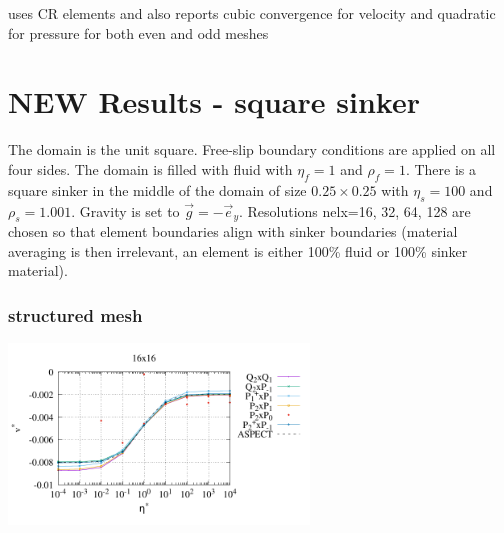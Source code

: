 \textcite{demh19} uses CR elements and also reports cubic convergence for velocity and quadratic for pressure
for both even and odd meshes


\newpage
\section*{NEW Results - square sinker}

The domain is the unit square. Free-slip boundary conditions are applied on all 
four sides. The domain is filled with fluid with $\eta_f=1$ and $\rho_f=1$.
There is a square sinker in the middle of the domain of size $0.25\times 0.25$ with $\eta_s=100$ and
$\rho_s=1.001$. Gravity is set to $\vec{g}=-\vec{e}_y$. 
Resolutions nelx=16, 32, 64, 128 are chosen so that element boundaries align with sinker boundaries 
(material averaging is then irrelevant, an element is either 100\% fluid or 100\% sinker material). 


\subsubsection*{structured mesh}


\begin{center}
\includegraphics[width=8cm]{python_codes/fieldstone_120/paperresults/sinker/structured/sinker_vel_16}
\end{center}


